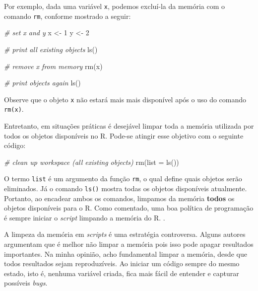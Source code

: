 \documentclass[
  11pt,
]{book}
\newenvironment{Shaded}{\begin{snugshade}}{\end{snugshade}}
\newcommand{\AttributeTok}[1]{\textcolor[rgb]{0.61,0.61,0.61}{#1}}
\newcommand{\CommentTok}[1]{\textcolor[rgb]{0.37,0.37,0.37}{\textit{#1}}}
\newcommand{\DecValTok}[1]{\textcolor[rgb]{0.06,0.06,0.06}{#1}}
\newcommand{\FunctionTok}[1]{\textcolor[rgb]{0,0,0}{#1}}
\newcommand{\NormalTok}[1]{#1}
\newcommand{\OtherTok}[1]{\textcolor[rgb]{0.37,0.37,0.37}{#1}}
\newcommand{\StringTok}[1]{\textcolor[rgb]{0.5,0.5,0.5}{#1}}
\newenvironment{rmdcaution}
{\begin{cautionblock}

} {\end{cautionblock}}
\begin{document}
Por exemplo, dada uma variável \texttt{x}, podemos excluí-la da memória com o comando \texttt{rm}, conforme mostrado a seguir: 

\begin{Shaded}
\begin{Highlighting}[]
\CommentTok{\# set x and y}
\NormalTok{x }\OtherTok{\textless{}{-}} \DecValTok{1}
\NormalTok{y }\OtherTok{\textless{}{-}} \DecValTok{2}

\CommentTok{\# print all existing objects}
\FunctionTok{ls}\NormalTok{()}

\CommentTok{\# remove x from memory}
\FunctionTok{rm}\NormalTok{(}\StringTok{\textquotesingle{}x\textquotesingle{}}\NormalTok{)}

\CommentTok{\# print objects again}
\FunctionTok{ls}\NormalTok{()}
\end{Highlighting}
\end{Shaded}

Observe que o objeto \texttt{x} não estará mais mais disponível após o uso do comando \texttt{rm(\textquotesingle{}x\textquotesingle{})}.

Entretanto, em situações práticas é desejável limpar toda a memória utilizada por todos os objetos disponíveis no R. Pode-se atingir esse objetivo com o seguinte código:

\begin{Shaded}
\begin{Highlighting}[]
\CommentTok{\# clean up workspace (all existing objects)}
\FunctionTok{rm}\NormalTok{(}\AttributeTok{list =} \FunctionTok{ls}\NormalTok{())}
\end{Highlighting}
\end{Shaded}

O termo \texttt{list} é um argumento da função \texttt{rm}, o qual define quais objetos serão eliminados. Já o comando \texttt{ls()} mostra todas os objetos disponíveis atualmente. Portanto, ao encadear ambos os comandos, limpamos da memória \textbf{todos} os objetos disponíveis para o R. Como comentado, uma boa política de programação é sempre iniciar o \emph{script} limpando a memória do R. .

\begin{rmdcaution}
A limpeza da memória em \emph{scripts} é uma estratégia controversa.
Alguns autores argumentam que é melhor não limpar a memória pois isso
pode apagar resultados importantes. Na minha opinião, acho fundamental
limpar a memória, desde que todos resultados sejam reproduzíveis. Ao
iniciar um código sempre do mesmo estado, isto é, nenhuma variável
criada, fica mais fácil de entender e capturar possíveis \emph{bugs}.
\end{rmdcaution}
\end{document}
